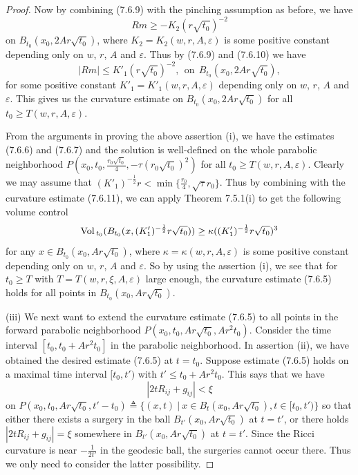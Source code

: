\begin{proof}
Now by combining (7.6.9) with the pinching assumption as before,
we have \begin{equation}
Rm\geq  -K_2(r\sqrt{t_0})^{-2} %
\end{equation} on $B_{t_0}(x_0,2Ar\sqrt{t_0})$, where
$K_2=K_2(w,r,A,\varepsilon)$ is some positive constant depending
only on $w$, $r$, $A$ and $\varepsilon$. Thus by (7.6.9) and
(7.6.10) we have \begin{equation} |Rm|\leq K'_1(r\sqrt{t_0})^{-2},\
 \ \mbox{on}\ \ B_{t_0}(x_0,2Ar\sqrt{t_0}), %
\end{equation} for some positive constant $K'_1=K'_1(w,r,A,\varepsilon)$
depending only on $w$, $r$, $A$ and $\varepsilon$. This gives us
the curvature estimate on $B_{t_0}(x_0,2Ar\sqrt{t_0})$ for all
$t_0 \geq T(w,r,A,\varepsilon)$.

{}From the arguments in proving the above assertion (i), we have
the estimates (7.6.6) and (7.6.7) and the solution is well-defined
on the whole parabolic neighborhood
$P(x_0,t_0,\frac{r_0\sqrt{t_0}}{4},-\tau(r_0\sqrt{t_0})^2)$ for
all $t_0 \geq T(w,r,A,\varepsilon)$. Clearly we may assume that
$(K'_1)^{-\frac{1}{2}}r < \min \{\frac{r_0}{4}, \sqrt{\tau}r_0
\}$. Thus by combining with the curvature estimate (7.6.11), we
can apply Theorem 7.5.1(i) to get the following volume control \begin{equation}
\Vol_{t_0}(B_{t_0}(x,(K'_1)^{-\frac{1}{2}}r\sqrt{t_0}))
\geq \kappa((K'_1)^{-\frac{1}{2}}r\sqrt{t_0})^3 %
\end{equation} for any $x\in B_{t_0}(x_0,Ar\sqrt{t_0})$, where
$\kappa=\kappa(w,r,A,\varepsilon)$ is some positive constant
depending only on $w$, $r$, $A$ and $\varepsilon$. So by using the
assertion (i), we see that for $t_0\geq T$ with
$T=T(w,r,\xi,A,\varepsilon)$ large enough, the curvature estimate
(7.6.5) holds for all points in $B_{t_0}(x_0,Ar\sqrt{t_0})$.

\medskip
(iii) We next want to extend the curvature estimate (7.6.5) to all
points in the forward parabolic neighborhood
$P(x_0,t_0,Ar\sqrt{t_0},Ar^2t_0)$. Consider the time interval
$[t_0,t_0+Ar^2t_0]$ in the parabolic neighborhood. In assertion
(ii), we have obtained the desired estimate (7.6.5) at $t=t_0$.
Suppose estimate (7.6.5) holds on a maximal time interval
$[t_0,t')$ with $t'\leq t_0+Ar^2t_0$. This says that we have \begin{equation}
|2tR_{ij}+g_{ij}|<\xi %
\end{equation} on $P(x_0,t_0,Ar\sqrt{t_0},t'-t_0)\triangleq\{(x,t)\ |\ x\in
B_t(x_0,Ar\sqrt{t_0}),t\in[t_0,t')\}$ so that either there exists
a surgery in the ball $B_{t'}(x_0,Ar\sqrt{t_0})$ at $t=t'$, or
there holds $|2tR_{ij}+g_{ij}|=\xi$ somewhere in
$B_{t'}(x_0,Ar\sqrt{t_0})$ at $t=t'$. Since the Ricci curvature is
near $-\frac{1}{2t'}$ in the geodesic ball, the surgeries cannot
occur there. Thus we only need to consider the latter possibility.


\end{proof}
